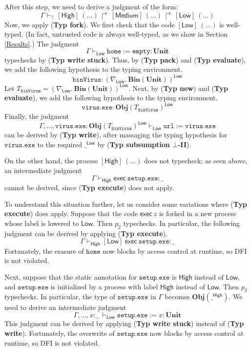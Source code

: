 \documentclass{sigplanconf}
\newcommand{\trule}[1]{(\textbf{Typ #1})}
\begin{document}
After this step, we need to derive a judgment of the form:
$$\Gamma \vdash_\top [\mathsf{High}]~(\dots)~\Rsh~[\mathsf{Medium}]~(\dots)~\Rsh~[\mathsf{Low}]~(\dots)$$
Now, we apply \trule{fork}. We first check that the code $[\mathsf{Low}]~(\dots)$ is well-typed. (In fact, untrusted code is always well-typed, as we show in Section \ref{Results}.) The judgment 
$$\Gamma \vdash_\mathsf{Low} \mathtt{home} := \mathtt{empty} : \mathbf{Unit} 
$$
typechecks by \trule{write stuck}. Thus, by \trule{pack} and \trule{evaluate}, we add the following hypothesis to the typing environment.
$$\mathtt{binVirus} : (\nabla_\mathsf{Low}.~\mathbf{Bin}(\mathbf{Unit}))^\mathsf{Low}$$
Let $T_\mathtt{binVirus} = (\nabla_\mathsf{Low}.~\mathbf{Bin}(\mathbf{Unit}))^\mathsf{Low}$. Next, by \trule{new} and \trule{evaluate}, we add the following hypothesis to the typing environment.
$$\mathtt{virus.exe}:\mathbf{Obj}(T_\mathtt{binVirus})^\mathsf{Low}$$
Finally, the judgment 
$$\Gamma, \dots, \mathtt{virus.exe}:\mathbf{Obj}(T_\mathtt{binVirus})^\mathsf{Low} \vdash_\mathsf{Low} \mathtt{url} := \mathtt{virus.exe}$$ 
can be derived by \trule{write}, after massaging the typing hypothesis for $\mathtt{virus.exe}$ to the required $\_^\mathsf{Low}$ by \trule{subsumption $\bot$-II}. 

On the other hand, the process $[\mathsf{High}]~(\dots)$ does not typecheck; as seen above, an intermediate judgment
\begin{equation*}
\Gamma \vdash_\mathsf{High} \mathsf{exec}~\mathtt{setup.exe} : \_
\end{equation*}
cannot be derived, since \trule{execute} does not apply.

To understand this situation further, let us consider some variations where \trule{execute} does apply. Suppose that the code $\mathsf{exec}~z$ is forked in a new process whose label is lowered to $\mathsf{Low}$. Then $p_2$ typechecks. In particular, the following judgment can be derived by applying \trule{execute}. \begin{equation*}
\Gamma  \vdash_\mathsf{High} [\mathsf{Low}]~\mathsf{exec}~\mathtt{setup.exe} : \_
\end{equation*}
Fortunately, the erasure of $\mathtt{home}$ now blocks by access control at runtime, so DFI is not violated. 

Next, suppose that the static annotation for $\mathtt{setup.exe}$ is $\mathsf{High}$ instead of $\mathsf{Low}$, and $\mathtt{setup.exe}$ is initialized by a process with label $\mathsf{High}$ instead of $\mathsf{Low}$. Then $p_2$ typechecks. In particular, the type of $\mathtt{setup.exe}$ in $\Gamma$ becomes $\mathbf{Obj}(\_^\mathsf{High})$. We need to derive an intermediate judgment 
\begin{equation*}
\Gamma, \dots, x : \_ ~\vdash_\mathsf{Low} \mathtt{setup.exe}:= x : \mathbf{Unit}
\end{equation*}
This judgment can be derived by applying \trule{write stuck} instead of \trule{write}. Fortunately, the overwrite of $\mathtt{setup.exe}$ now blocks by access control at runtime, so DFI is not violated. 
\end{document}

